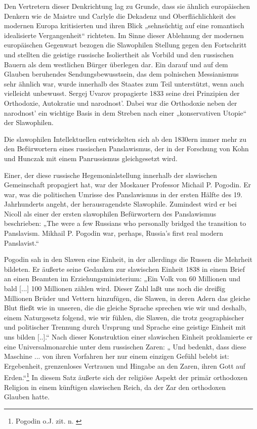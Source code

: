 \documentclass[12pt,headsepline,a4paper]{scrartcl}
\begin{document}
Den Vertretern dieser Denkrichtung lag zu Grunde, dass sie ähnlich europäischen Denkern
wie de Maistre und Carlyle die Dekadenz und Oberflächlichkeit des modernen Europa
kritisierten und ihren Blick „sehnsüchtig auf eine romantisch idealisierte Vergangenheit“\autocite[120]{kohn}
 richteten. Im Sinne dieser Ablehnung der modernen europäischen
Gegenwart bezogen die Slawophilen Stellung gegen den Fortschritt und stellten die geistige
russische Isoliertheit als Vorbild und den russischen Bauern als dem westlichen Bürger
überlegen dar. Ein darauf und auf dem Glauben beruhendes Sendungsbewusstsein, das dem
polnischen Messianismus sehr ähnlich war, wurde innerhalb des Staates zum Teil unterstützt,
wenn auch vielleicht unbewusst. Sergej Uvarov propagierte 1833 seine drei Prinzipien der
Orthodoxie, Autokratie und narodnost'. Dabei war die Orthodoxie neben der narodnost' ein
wichtige Basis in dem Streben nach einer „konservativen Utopie“\autocite[408]{walicki} der
Slawophilen.

Die slawophilen Intellektuellen entwickelten sich ab den 1830ern immer mehr zu den
Befürwortern eines russischen Panslawismus, der in der Forschung von Kohn\autocite{kohn} und
Hunczak\autocite{hunczak} mit einem Panrussismus gleichgesetzt wird.

Einer, der diese russische Hegemonialstellung innerhalb der slawischen Gemeinschaft
propagiert hat, war der Moskauer Professor Michail P. Pogodin. Er war, was die politischen
Umrisse des Panslawismus in der ersten Hälfte des 19. Jahrhunderts angeht, der
herausragendste Slawophile. Zumindest wird er bei Nicoll\autocite[232]{nicoll} als einer der ersten
slawophilen Befürwortern des Panslawismus beschrieben: „The were a few Russians who
personally bridged the transition to Panslavism. Mikhail P. Pogodin war, perhaps, Russia's
first real modern Panslavist.“

Pogodin sah in den Slawen eine Einheit, in der allerdings die Russen die Mehrheit bildeten. Er
äußerte seine Gedanken zur slawischen Einheit 1838 in einem Brief an einen Beamten im
Erziehungsministerium: „Ein Volk von 60 Millionen und bald [...] 100 Millionen zählen wird.
Dieser Zahl laßt uns noch die dreißig Millionen Brüder und Vettern hinzufügen, die Slawen,
in deren Adern das gleiche Blut fließt wie in unseren, die die gleiche Sprache sprechen wie
wir und deshalb, einem Naturgesetz folgend, wie wir fühlen, die Slawen, die trotz
geographischer und politischer Trennung durch Ursprung und Sprache eine geistige Einheit
mit uns bilden [..].“ Nach dieser Konstruktion einer slawischen Einheit proklamierte er eine
Universalmonarchie unter dem russischen Zaren: „ Und bedenkt, dass diese Maschine ... von
ihren Vorfahren her nur einem einzigen Gefühl belebt ist: Ergebenheit, grenzenloses Vertrauen
und Hingabe an den Zaren, ihren Gott auf Erden.“\footnote{Pogodin o.J. zit. n. \autocite[128]{kohn}}
In diesem Satz äußerte sich der religiöse Aspekt der primär orthodoxen Religion in einem
künftigen slawischen Reich, da der Zar den orthodoxen Glauben hatte.
\end{document}
